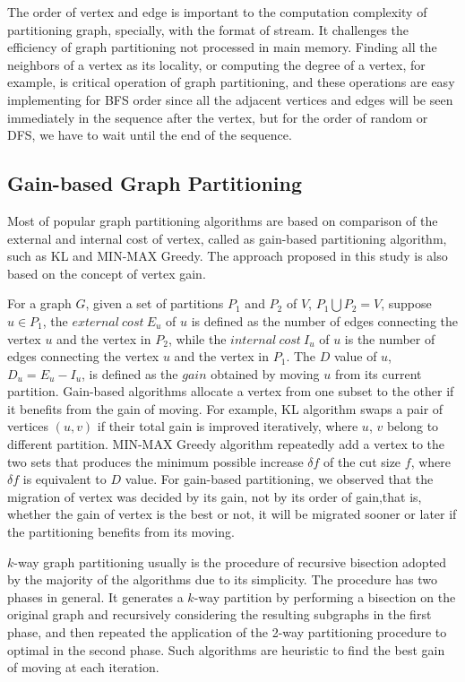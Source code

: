 \documentclass{sig-alternate-2013}
\begin{document}
The order of vertex and edge is important to the computation complexity of partitioning graph, specially, with the format of stream. It challenges the efficiency of graph partitioning not processed in main memory. Finding all the neighbors of a vertex as its locality, or computing the degree of a vertex, for example, is critical operation of graph partitioning, and these operations are easy implementing for BFS order since all the adjacent vertices and edges will be seen immediately in the sequence after the vertex, but for the order of random or DFS, we have to wait until the end of the sequence.

\subsection{Gain-based Graph Partitioning}
Most of popular graph partitioning algorithms are based on comparison of the external and internal cost of vertex, called as gain-based partitioning algorithm, such as KL and MIN-MAX Greedy. The approach proposed in this study is also based on the concept of vertex gain.

For a graph $G$, given a set of partitions $P_1$ and $P_2$ of $V$, $P_1 {\bigcup} P_2 = V$, suppose $u\in P_1$, the $external\ cost\ E_u$  of $u$ is defined as the number of edges connecting the vertex $u$ and the vertex in $P_2$, while the $internal\ cost\ I_u$ of $u$ is the number of edges connecting the vertex $u$ and the vertex in $P_1$.
The $D$ value of $u$, $D_u = E_u-I_u$, is defined as the $gain$ obtained by moving $u$ from its current partition. Gain-based algorithms allocate a vertex from one subset to the other if it benefits from the gain of moving. For example, KL algorithm swaps a pair of vertices $(u, v)$ if their total gain is improved iteratively, where $u$, $v$ belong to different partition. MIN-MAX Greedy algorithm repeatedly add a vertex to the two sets that produces the minimum possible increase $\delta f$ of the cut size $f$, where $\delta f$ is equivalent to $D$ value. For gain-based partitioning, we observed that the migration of vertex was decided by its gain, not by its order of gain,that is, whether the gain of vertex is the best or not, it will be migrated sooner or later if the partitioning benefits from its moving.

$k$-way graph partitioning usually is the procedure of recursive bisection adopted by the majority of the algorithms due to its simplicity. The procedure has two phases in general. It generates a $k$-way partition by performing a bisection on the original graph and recursively considering the resulting subgraphs in the first phase,  and then repeated the application of the 2-way partitioning procedure to optimal in the second phase.  Such algorithms are heuristic to find the best gain of moving at each iteration.
\end{document}
